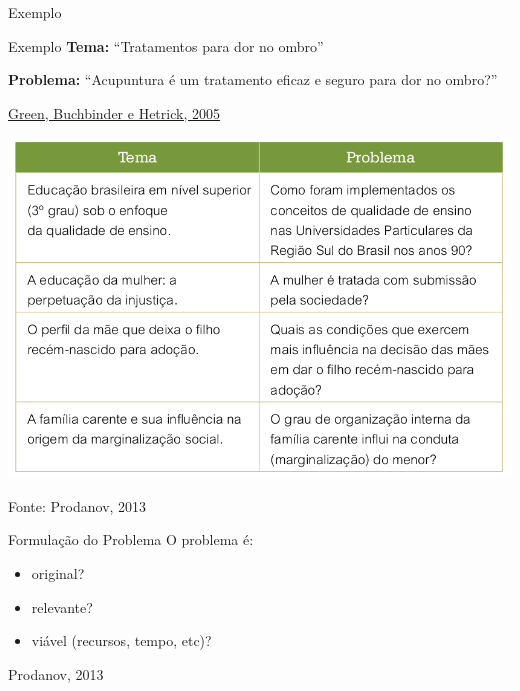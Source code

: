\documentclass{beamer}
\begin{document}
\begin{frame}{Exemplo}
  \begin{exampleblock}{Exemplo}
    \small
    {\bf Tema: }``Tratamentos para dor no ombro''

    \bigskip

    {\bf Problema:} ``Acupuntura é um tratamento eficaz e seguro para dor no ombro?''
  \end{exampleblock}

  \vfill
  \scriptsize
  \hfill \href{https://doi.org/10.1002/14651858.CD005319}{Green, Buchbinder e Hetrick, 2005}
\end{frame}

\begin{frame}
  \begin{center}
  \includegraphics[height=0.8\textheight]{Hipoteses_variaveis/tema_problema}
\end{center}

  \vfill
  \scriptsize
  \hfill Fonte: Prodanov, 2013
\end{frame}

\begin{frame}{Formulação do Problema}
O problema é:
  \begin{itemize}
    \footnotesize
  \item original?
    \bigskip
  \item relevante?
    \bigskip
  \item viável (recursos, tempo, etc)?
  \end{itemize}

  \vfill
  \scriptsize
  \hfill Prodanov, 2013
\end{frame}
\end{document}
